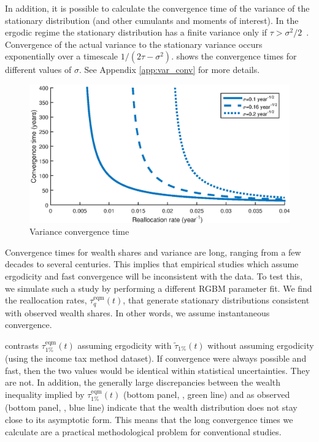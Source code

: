 In addition, it is possible to calculate the convergence time of the variance of the stationary distribution (and other cumulants and moments of interest). In the ergodic regime the stationary distribution has a finite variance only if $\tau > \sigma^2/2$~\cite{LiuSerota2016}. Convergence of the actual variance to the stationary variance occurs exponentially over a timescale $1/(2\tau - \sigma^2)$.  shows the convergence times for different values of $\sigma$. See Appendix \ref{app:var_conv} for more details.

\begin{figure}[!htb]
\centering
\includegraphics[width=1.0\textwidth] {./chapter_3/figs/variance_convergence.eps}
\caption{Variance convergence time}
\end{figure}

Convergence times for wealth shares and variance are long, ranging from a few decades to several centuries. This implies that empirical studies which assume ergodicity and fast convergence will be inconsistent with the data. To test this, we simulate such a study by performing a different RGBM parameter fit. We find the reallocation rates, $\tau^\text{eqm}_q\left(t\right)$, that generate stationary distributions consistent with observed wealth shares. In other words, we assume instantaneous convergence.

 contrasts $\tau^\text{eqm}_{1\%}\left(t\right)$ assuming ergodicity with $\widetilde{\tau}_{1\%}\left(t\right)$ without assuming ergodicity (using the income tax method dataset). If convergence were always possible and fast, then the two values would be identical within statistical uncertainties. They are not. In addition, the generally large discrepancies between the wealth inequality implied by $\tau^\text{eqm}_{1\%}\left(t\right)$ (bottom panel, , green line) and as observed (bottom panel, , blue line) indicate that the wealth distribution does not stay close to its asymptotic form. This means that the long convergence times we calculate are a practical methodological problem for conventional studies.

